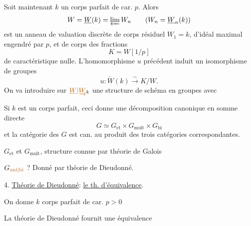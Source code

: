Soit maintenant $k$ un corps parfait de car. $p$. Alors
\[
W=\underline{W}(k)=\varprojlim W_n\qquad(W_n=\underline{W}_n(k))
\]
est un anneau de valuation discrète de corps résiduel  $W_1=k$, d'idéal maximal engendré par $p$, et de corps des fractions
\[
K=W[1/p]
\]
de caractéristique nulle. L'homomorphisme $u$ précédent induit un isomorphisme de groupes
\[
u:\underrightarrow{W}(k)\xrightarrow{\sim}K/W.
\]
On va introduire sur $\unsure{\underline{W}|\underrightarrow{W}}_k$ une structure de schéma en groupes avec

Si $k$ est un corps parfait, ceci donne une décomposition canonique en somme directe
\[
G\simeq G_{\mathrm{et}}\times G_{\mathrm{mult}}\times G_{\mathrm{bi}}
\]
et la catégorie des $G$ est can.  au produit des trois catégories correspondantes.

$G_{\mathrm{et}}$ et $G_{\mathrm{mult}}$, structure connue par théorie de Galois

$G_{\unsure{\mathrm{uni}|\mathrm{bi}}}$ ? Donné par théorie de Dieudonné.


4. \uline{Théorie de Dieudonné}: \uline{le th. d'équivalence}.

On donne $k$ corps parfait de car. $p>0$

La théorie de Dieudonné fournit une équivalence

